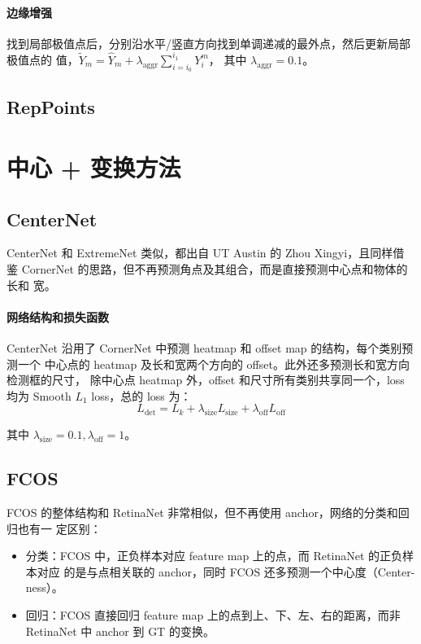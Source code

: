 \paragraph{边缘增强}
找到局部极值点后，分别沿水平/竖直方向找到单调递减的最外点，然后更新局部极值点的
值，$\tilde{Y}_m = \hat{Y}_m + \lambda_{\mathrm{aggr}}\sum_{i=i_0}^{i_1}Y_i^m$，
其中 $\lambda_{\mathrm{aggr}}=0.1$。

\subsection{RepPoints}

\section{中心 + 变换方法}
\subsection{CenterNet}
\label{sec:CenterNet}
CenterNet 和 ExtremeNet 类似，都出自 UT Austin 的 Zhou Xingyi，且同样借
鉴 CornerNet 的思路，但不再预测角点及其组合，而是直接预测中心点和物体的长和
宽。

\paragraph{网络结构和损失函数}
CenterNet 沿用了 CornerNet 中预测 heatmap 和 offset map 的结构，每个类别预测一个
中心点的 heatmap 及长和宽两个方向的 offset。此外还多预测长和宽方向检测框的尺寸，
除中心点 heatmap 外，offset 和尺寸所有类别共享同一个，loss 均为 Smooth $L_1$
loss，总的 loss 为：
\begin{equation}
  \label{equ:extreme-net-loss}
  L_{\mathrm{det}} = L_k + \lambda_{\mathrm{size}}L_{\mathrm{size}} + \lambda_{\mathrm{off}}L_{\mathrm{off}}
\end{equation}

其中 $\lambda_{\mathrm{size}}=0.1, \lambda_{\mathrm{off}}=1$。

\subsection{FCOS}
\label{sec:FCOS}
FCOS 的整体结构和 RetinaNet 非常相似，但不再使用 anchor，网络的分类和回归也有一
定区别：

\begin{itemize}
  \item 分类：FCOS 中，正负样本对应 feature map 上的点，而 RetinaNet 的正负样本对应
    的是与点相关联的 anchor，同时 FCOS 还多预测一个中心度（Center-ness）。
  \item 回归：FCOS 直接回归 feature map 上的点到上、下、左、右的距离，而非 RetinaNet
    中 anchor 到 GT 的变换。
\end{itemize}

